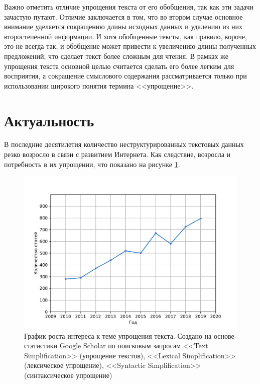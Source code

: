 Важно отметить отличие упрощения текста от его обобщения, так как эти задачи зачастую путают. Отличие заключается в том, что во втором случае основное внимание уделяется сокращению длины исходных данных и удалению из них второстепенной информации. И хотя обобщенные тексты, как правило, короче, это не всегда так, и обобщение может привести к увеличению длины полученных предложений\cite{shardlow_survey_2014}, что сделает текст более сложным для чтения. В рамках же упрощения текста основной целью считается сделать его более легким для восприятия, а сокращение смыслового содержания рассматривается только при использовании широкого понятия термина <<упрощение>>.

\section{Актуальность}
В последние десятилетия количество неструктурированных текстовых данных резко возросло в связи с развитием Интернета. Как следствие, возросла и потребность в их упрощении, что показано на рисунке \ref{fig:growth_of_interest}. 

\captionsetup{justification=centering,singlelinecheck=off}
\begin{figure}[h!]
	\centering
		\includegraphics[pages=-, scale=0.8]{./inc/img/graph.pdf}
		\caption{График роста интереса к теме упрощения текста. Создано на основе статистики Google Scholar по поисковым запросам <<Text Simplification>> (упрощение текстов),  <<Lexical Simplification>> (лексическое упрощение), <<Syntactic Simplification>> (синтаксическое упрощение)\cite{sikka_survey_2020}}  
		\label{fig:growth_of_interest}
\end{figure}

